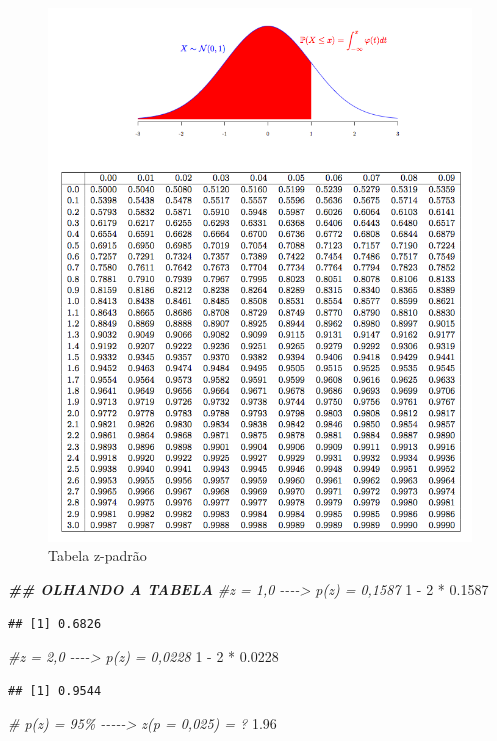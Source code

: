 \documentclass[
]{article}
\newenvironment{Shaded}{\begin{snugshade}}{\end{snugshade}}
\newcommand{\CommentTok}[1]{\textcolor[rgb]{0.56,0.35,0.01}{\textit{#1}}}
\newcommand{\DecValTok}[1]{\textcolor[rgb]{0.00,0.00,0.81}{#1}}
\newcommand{\DocumentationTok}[1]{\textcolor[rgb]{0.56,0.35,0.01}{\textbf{\textit{#1}}}}
\newcommand{\FloatTok}[1]{\textcolor[rgb]{0.00,0.00,0.81}{#1}}
\newcommand{\SpecialCharTok}[1]{\textcolor[rgb]{0.00,0.00,0.00}{#1}}
\begin{document}
\begin{figure}

{\centering \includegraphics[width=0.6\linewidth]{normal-table} 

}

\caption{Tabela z-padrão}\label{fig:ztable}
\end{figure}

\begin{Shaded}
\begin{Highlighting}[]
\DocumentationTok{\#\# OLHANDO A TABELA}
\CommentTok{\#z = 1,0 {-}{-}{-}{-}\textgreater{} p(z) = 0,1587}
\DecValTok{1} \SpecialCharTok{{-}} \DecValTok{2} \SpecialCharTok{*} \FloatTok{0.1587}
\end{Highlighting}
\end{Shaded}

\begin{verbatim}
## [1] 0.6826
\end{verbatim}

\begin{Shaded}
\begin{Highlighting}[]
\CommentTok{\#z = 2,0 {-}{-}{-}{-}\textgreater{} p(z) = 0,0228}
\DecValTok{1} \SpecialCharTok{{-}} \DecValTok{2} \SpecialCharTok{*} \FloatTok{0.0228}
\end{Highlighting}
\end{Shaded}

\begin{verbatim}
## [1] 0.9544
\end{verbatim}

\begin{Shaded}
\begin{Highlighting}[]
\CommentTok{\# p(z) = 95\% {-}{-}{-}{-}{-}\textgreater{} z(p = 0,025) = ?}
\FloatTok{1.96}
\end{Highlighting}
\end{Shaded}
\end{document}
